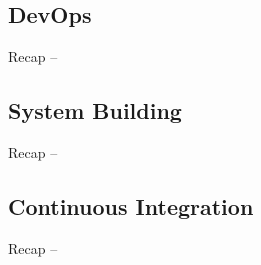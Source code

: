 
\subsection{DevOps}
\begin{frame}{Recap -- \insertsubsection \mytitlesource{\handbuch}}
	\frameDevOps
\end{frame}

\subsection{System Building}
\begin{frame}{Recap -- \insertsubsection \mytitlesource{\sommerville}}
	\frameSystemBuilding
\end{frame}

\subsection{Continuous Integration}
\begin{frame}{Recap -- \insertsubsection \mytitlesource{\sommerville}}
	\frameContinousIntegration
\end{frame}



\begin{frame}{\insertsubsection}
	\centering{}
\end{frame}


